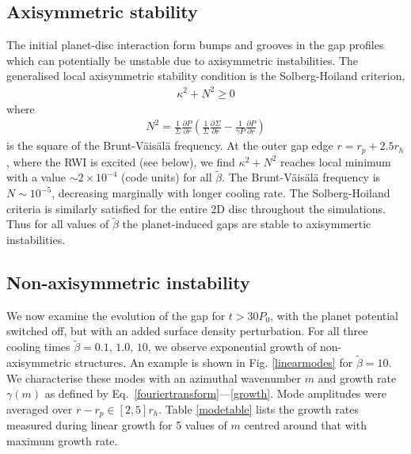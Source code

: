 \subsection{Axisymmetric stability}
The initial planet-disc interaction form bumps and grooves in the gap profiles
which can potentially be unstable due to axisymmetric instabilities. The
generalised local axisymmetric stability condition is the Solberg-Hoiland
criterion,  
\begin{align}
  \kappa^2+N^2 \geq 0 
\end{align}
where
\begin{align}
 N^2=\frac{1}{\Sigma} \frac{\partial P}{\partial r}
 \left(\frac{1}{\Sigma} \frac{\partial \Sigma}{\partial
     r}-\frac{1}{\gamma P} \frac{\partial P}{\partial r}  \right) 
\end{align}
is the square of the Brunt-V\"ais\"al\"a frequency. 
At the outer gap edge $r=r_p+2.5r_h$,  where the RWI is excited
(see below), we find $\kappa^2 + N^2$ reaches local minimum with a value
$\sim 2\times10^{-4}$ (code units) for all $\tilde\beta$. The
Brunt-V\"ais\"al\"a frequency is $N\sim 10^{-5}$, decreasing marginally with longer cooling rate. 
The Solberg-Hoiland criteria is similarly satisfied for the entire 2D disc throughout the 
simulations.
Thus for all values of $\tilde\beta$ the planet-induced gaps are
stable to axisymmertic instabilities. 



\subsection{Non-axisymmetric instability}\label{linear}
We now examine the evolution of the gap for $t>30P_0$, with the
planet potential switched off, but with an added surface density
perturbation. For all three cooling times $\tilde{\beta}=0.1,\, 1.0,\,
10$, we observe exponential growth of non-axisymmetric
structures. An example is shown in Fig. \ref{linearmodes} for 
$\tilde{\beta}=10$. We characterise these
modes with an azimuthal wavenumber $m$ and growth rate $\gamma(m)$ as defined by
Eq.~\ref{fouriertransform}---\ref{growth}. Mode amplitudes were
averaged over $r-r_p\in[2,5]r_h$. Table \ref{modetable}
lists the growth rates measured during 
linear growth for 5 values of $m$ centred around that with maximum
growth rate. 

